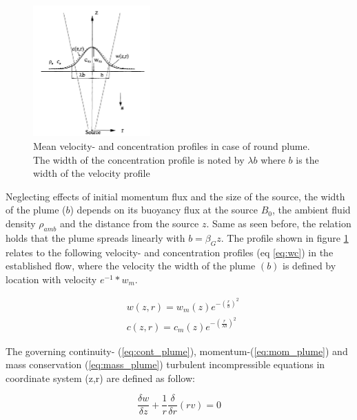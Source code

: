 \begin{figure}[ht!]
    \centering
    \includegraphics[width=0.4\textwidth]{Images/Round_plume.png}
    \caption{Mean velocity- and concentration profiles in case of round plume. The width of the concentration profile is noted by $\lambda b$ where $b$ is the width of the velocity profile}
    \label{fig:round_plume}
\end{figure}


\newpage
\noindent Neglecting effects of initial momentum flux and the size of the source, the width of the plume ($b$) depends on its buoyancy flux at the source $B_0$, the ambient fluid density $\rho_{amb}$ and the distance from the source $z$. Same as seen before, the relation holds that the plume spreads linearly with $b = \beta_G z$. The profile shown in figure \ref{fig:round_plume} relates to the following velocity- and concentration profiles (eq \ref{eq:wc}) in the established flow, where the velocity the width of the plume $(b)$ is defined by location with velocity $e^{-1}*w_m$.

\begin{equation}
    \begin{split}
        & w(z,r) = w_m(z) e^{-(\frac{r}{b})^2} \\
        & c(z,r) = c_m(z) e^{-(\frac{r}{\lambda b})^2}
    \end{split}
    \label{eq:wc}
\end{equation}

\noindent The governing continuity- (\ref{eq:cont_plume}), momentum-(\ref{eq:mom_plume}) and mass conservation (\ref{eq:mass_plume}) turbulent incompressible equations in coordinate system (z,r) are defined as follow:

\begin{equation}
    \frac{\delta w}{\delta z} + \frac{1}{r}\frac{\delta}{\delta r} (rv) = 0
    \label{eq:cont_plume}
\end{equation}

